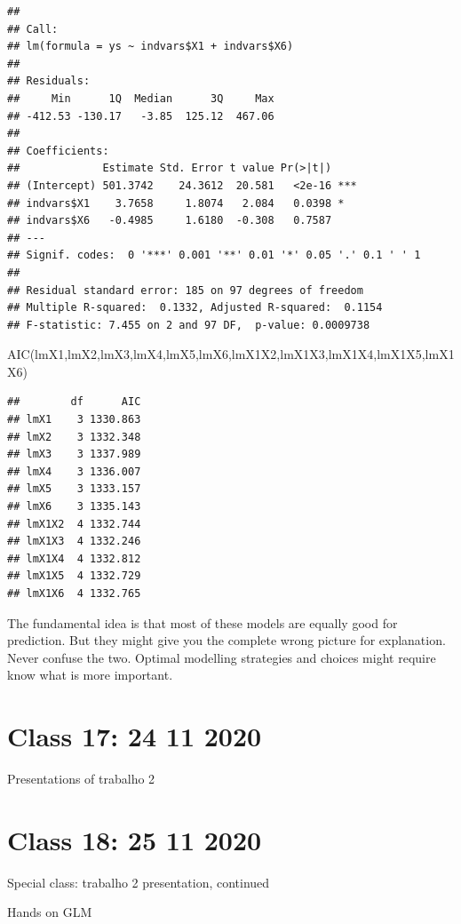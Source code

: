 \documentclass[
]{book}
\newenvironment{Shaded}{\begin{snugshade}}{\end{snugshade}}
\newcommand{\FunctionTok}[1]{\textcolor[rgb]{0.00,0.00,0.00}{#1}}
\newcommand{\NormalTok}[1]{#1}
\begin{document}
\begin{verbatim}
## 
## Call:
## lm(formula = ys ~ indvars$X1 + indvars$X6)
## 
## Residuals:
##     Min      1Q  Median      3Q     Max 
## -412.53 -130.17   -3.85  125.12  467.06 
## 
## Coefficients:
##             Estimate Std. Error t value Pr(>|t|)    
## (Intercept) 501.3742    24.3612  20.581   <2e-16 ***
## indvars$X1    3.7658     1.8074   2.084   0.0398 *  
## indvars$X6   -0.4985     1.6180  -0.308   0.7587    
## ---
## Signif. codes:  0 '***' 0.001 '**' 0.01 '*' 0.05 '.' 0.1 ' ' 1
## 
## Residual standard error: 185 on 97 degrees of freedom
## Multiple R-squared:  0.1332, Adjusted R-squared:  0.1154 
## F-statistic: 7.455 on 2 and 97 DF,  p-value: 0.0009738
\end{verbatim}

\begin{Shaded}
\begin{Highlighting}[]
\FunctionTok{AIC}\NormalTok{(lmX1,lmX2,lmX3,lmX4,lmX5,lmX6,lmX1X2,lmX1X3,lmX1X4,lmX1X5,lmX1X6)}
\end{Highlighting}
\end{Shaded}

\begin{verbatim}
##        df      AIC
## lmX1    3 1330.863
## lmX2    3 1332.348
## lmX3    3 1337.989
## lmX4    3 1336.007
## lmX5    3 1333.157
## lmX6    3 1335.143
## lmX1X2  4 1332.744
## lmX1X3  4 1332.246
## lmX1X4  4 1332.812
## lmX1X5  4 1332.729
## lmX1X6  4 1332.765
\end{verbatim}

The fundamental idea is that most of these models are equally good for prediction. But they might give you the complete wrong picture for explanation. Never confuse the two. Optimal modelling strategies and choices might require know what is more important.

\hypertarget{aula17}{%
\chapter{Class 17: 24 11 2020}\label{aula17}}

Presentations of trabalho 2

\hypertarget{aula18}{%
\chapter{Class 18: 25 11 2020}\label{aula18}}

Special class: trabalho 2 presentation, continued

Hands on GLM
\end{document}
